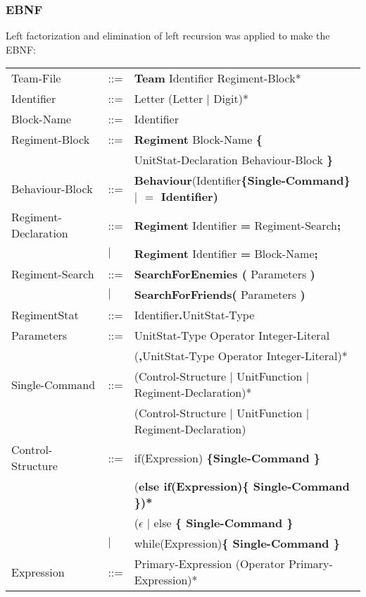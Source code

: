 	\subsubsection{EBNF}
		Left factorization and elimination of left recursion was applied to make the EBNF: \\
		\begin{center}
			\begin{longtable}{ l l l }
				\endfirsthead
				\endhead
		Team-File					&	::=	&{\bf Team} Identifier Regiment-Block*\\
		Identifier					&	::=	&Letter (Letter $\mid$ Digit)*\\
		Block-Name					&	::=	&Identifier\\
		Regiment-Block				&	::=	&{\bf Regiment} Block-Name {\bf \{ } \\
									&		&UnitStat-Declaration Behaviour-Block \bf{\} }\\
		Behaviour-Block				&	::=	&{\bf Behaviour}(Identifier\bf{\{}Single-Command\bf{\}} $\mid$ {\bf $=$} Identifier)\\
		Regiment-Declaration		&	::=	&{\bf Regiment} Identifier {\bf =} Regiment-Search{\bf ;}\\
									&$\mid$	&{\bf Regiment} Identifier {\bf =} Block-Name{\bf ;}\\
		Regiment-Search				&	::=	&{\bf SearchForEnemies (} Parameters {\bf )}\\
									&$\mid$	&{\bf SearchForFriends(} Parameters {\bf )}\\
		RegimentStat				&	::=	&Identifier{\bf.}UnitStat-Type \\
		Parameters					&	::=	&UnitStat-Type Operator Integer-Literal\\
									&		&({\bf ,}UnitStat-Type Operator Integer-Literal)*\\
		Single-Command				&	::=	&(Control-Structure $\mid$ UnitFunction $\mid$ Regiment-Declaration)*\\
									&		&(Control-Structure $\mid$ UnitFunction $\mid$ Regiment-Declaration)\\		
		Control-Structure			&	::=	&if(Expression) \bf{\{}Single-Command \bf{\}}\\
									&		&(\bf{else if(}Expression\bf{)\{ }Single-Command\bf{ \}})* \\
									&		&($\epsilon$ $\mid$ else \bf{\{ }Single-Command \bf{\} }\\					   
									&$\mid$	&while(Expression)\bf{\{ } Single-Command \bf{\}}\\
		Expression					&	::=	&Primary-Expression (Operator Primary-Expression)*\\

\end{longtable}
\end{center}
